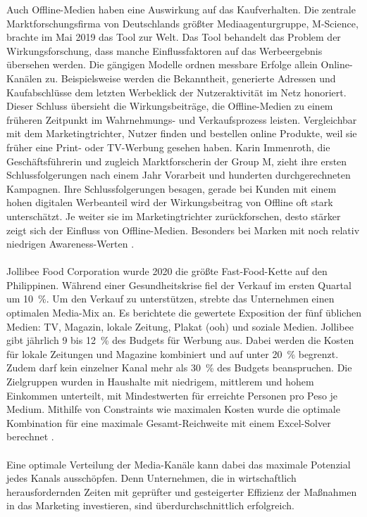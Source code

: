 Auch Offline-Medien haben eine Auswirkung auf das Kaufverhalten. Die zentrale Marktforschungsfirma von Deutschlands größter Mediaagenturgruppe, M-Science, brachte im Mai 2019 das Tool  zur Welt. Das Tool behandelt das Problem der Wirkungsforschung, dass manche Einflussfaktoren auf das Werbeergebnis übersehen werden. Die gängigen Modelle ordnen messbare Erfolge allein Online-Kanälen zu. Beispielsweise werden die Bekanntheit, generierte Adressen und Kaufabschlüsse dem letzten Werbeklick der Nutzeraktivität im Netz honoriert. Dieser Schluss übersieht die Wirkungsbeiträge, die Offline-Medien zu einem früheren Zeitpunkt im Wahrnehmungs- und Verkaufsprozess leisten. Vergleichbar mit dem Marketingtrichter, Nutzer finden und bestellen online Produkte, weil sie früher eine Print- oder TV-Werbung gesehen haben. Karin Immenroth, die Geschäftsführerin und zugleich Marktforscherin der Group M, zieht ihre ersten Schlussfolgerungen nach einem Jahr Vorarbeit und hunderten durchgerechneten Kampagnen. Ihre Schlussfolgerungen besagen, gerade bei Kunden mit einem hohen digitalen Werbeanteil wird der Wirkungsbeitrag von Offline oft stark unterschätzt. Je weiter sie im Marketingtrichter zurückforschen, desto stärker zeigt sich der Einfluss von Offline-Medien. Besonders bei Marken mit noch relativ niedrigen Awareness-Werten \cite[S. 4]{20190411492848}.
\\\\
Jollibee Food Corporation wurde 2020 die größte Fast-Food-Kette auf den Philippinen. Während einer Gesundheitskrise fiel der Verkauf im ersten Quartal um 10~\%. Um den Verkauf zu unterstützen, strebte das Unternehmen einen optimalen Media-Mix an. Es berichtete die gewertete Exposition der fünf üblichen Medien: TV, Magazin, lokale Zeitung, Plakat (\ac{ooh}) und soziale Medien. Jollibee gibt jährlich 9 bis 12~\% des Budgets für Werbung aus. Dabei werden die Kosten für lokale Zeitungen und Magazine kombiniert und auf unter 20~\% begrenzt. Zudem darf kein einzelner Kanal mehr als 30~\% des Budgets beanspruchen. Die Zielgruppen wurden in Haushalte mit niedrigem, mittlerem und hohem Einkommen unterteilt, mit Mindestwerten für erreichte Personen pro Peso je Medium. Mithilfe von Constraints wie maximalen Kosten wurde die optimale Kombination für eine maximale Gesamt-Reichweite mit einem Excel-Solver berechnet \cite{Tapiceria2020}. \\\\
Eine optimale Verteilung der Media-Kanäle kann dabei das maximale Potenzial jedes Kanals ausschöpfen. Denn Unternehmen, die in wirtschaftlich herausfordernden Zeiten mit geprüfter und gesteigerter Effizienz der Maßnahmen in das Marketing investieren, sind überdurchschnittlich erfolgreich\cite[S. ]{237097}. \\\\

